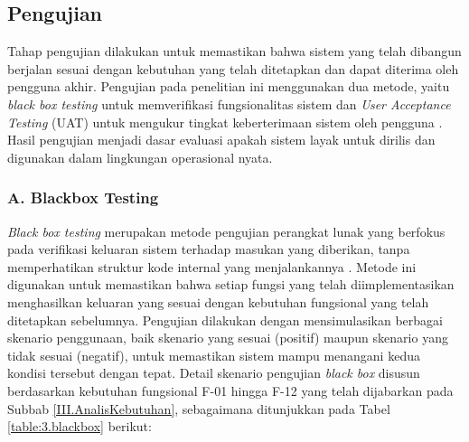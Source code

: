\subsection{Pengujian} \label{III.PengujianDetail}
Tahap pengujian dilakukan untuk memastikan bahwa sistem yang telah dibangun berjalan sesuai dengan kebutuhan yang telah ditetapkan dan dapat diterima oleh pengguna akhir. Pengujian pada penelitian ini menggunakan dua metode, yaitu \textit{black box testing} untuk memverifikasi fungsionalitas sistem dan \textit{User Acceptance Testing} (UAT) untuk mengukur tingkat keberterimaan sistem oleh pengguna \cite{abdillah2023blackbox}. Hasil pengujian menjadi dasar evaluasi apakah sistem layak untuk dirilis dan digunakan dalam lingkungan operasional nyata. \par

\subsubsection*{A. Blackbox Testing}
\textit{Black box testing} merupakan metode pengujian perangkat lunak yang berfokus pada verifikasi keluaran sistem terhadap masukan yang diberikan, tanpa memperhatikan struktur kode internal yang menjalankannya \cite{abdillah2023blackbox}. Metode ini digunakan untuk memastikan bahwa setiap fungsi yang telah diimplementasikan menghasilkan keluaran yang sesuai dengan kebutuhan fungsional yang telah ditetapkan sebelumnya. Pengujian dilakukan dengan mensimulasikan berbagai skenario penggunaan, baik skenario yang sesuai (positif) maupun skenario yang tidak sesuai (negatif), untuk memastikan sistem mampu menangani kedua kondisi tersebut dengan tepat. Detail skenario pengujian \textit{black box} disusun berdasarkan kebutuhan fungsional F-01 hingga F-12 yang telah dijabarkan pada Subbab \ref{III.AnalisKebutuhan}, sebagaimana ditunjukkan pada Tabel \ref{table:3.blackbox} berikut: \par

